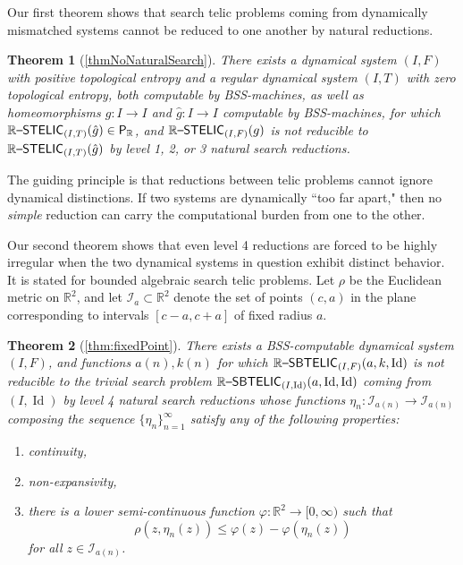 \documentclass{amsart}
\theoremstyle{theorem}
\newtheorem{theorem}{Theorem}[section]
\theoremstyle{remark}
\DeclareMathOperator{\Id}{Id}
\newcommand{\RR}{\mathbb{R}}
\newcommand{\ccP}{\textsf{\upshape P}}
\newcommand{\ccRSTELIC}{\mathbb{R}\textsf{\upshape --STELIC}}
\newcommand{\ccRSBTELIC}{\mathbb{R}\textsf{\upshape --SBTELIC}}
\newcommand{\cI}{\mathcal{I}}
\begin{document}
Our first theorem shows that search telic problems coming from dynamically mismatched systems cannot be reduced to one another by natural reductions.

\begin{theorem}[\cref{thmNoNaturalSearch}]\label{thmNoNaturalSearch1}
There exists a dynamical system $(I, F)$ with positive topological entropy and a regular dynamical system $(I, T)$ with zero topological entropy, both computable by BSS-machines, as well as homeomorphisms $g:I\rightarrow I$ and $\hat{g}:I\rightarrow I$ computable by BSS-machines, for which $\ccRSTELIC_{(I, T)}(\hat{g}) \in \ccP_\RR$, and $\ccRSTELIC_{(I, F)}(g)$ is not reducible to $\ccRSTELIC_{(I, T)}(\hat{g})$ by level 1, 2, or 3 natural search reductions.
\end{theorem}

The guiding principle is that reductions between telic problems cannot ignore dynamical distinctions. If two systems are dynamically ``too far apart," then no \emph{simple} reduction can carry the computational burden from one to the other.

Our second theorem shows that even level 4 reductions are forced to be highly irregular when the two dynamical systems in question exhibit distinct behavior.
It is stated for bounded algebraic search telic problems. Let $\rho$ be the Euclidean metric on $\RR^2$, and let $\cI_{a}\subset\RR^2$ denote the set of points $(c, a)$ in the plane corresponding to intervals $[c-a,c+a]$ of fixed radius $a$.

\begin{theorem}[\cref{thm:fixedPoint}]\label{thm:fixedPoint1}
There exists a BSS-computable dynamical system $(I, F)$, and functions $a(n), k(n)$ for which $\ccRSBTELIC_{(I, F)}(a, k,\Id)$ is not reducible to the trivial search problem  $\ccRSBTELIC_{(I, \Id)}(a, \Id,\Id)$ coming from $(I, \Id)$ by level 4 natural search reductions whose functions $\eta_n:\cI_{a(n)}\rightarrow \cI_{a(n)}$ composing the sequence $\{\eta_n\}_{n=1}^\infty$ satisfy any of the following properties:
\begin{enumerate}
\item continuity,
\item non-expansivity,
\item there is a lower semi-continuous function $\varphi:\RR^2\rightarrow [0,\infty)$ such that
\[
\rho(z, \eta_n(z))\leq \varphi(z)-\varphi(\eta_n(z))
\]
for all $z \in \cI_{a(n)}$.
\end{enumerate}
\end{theorem}
\end{document}

